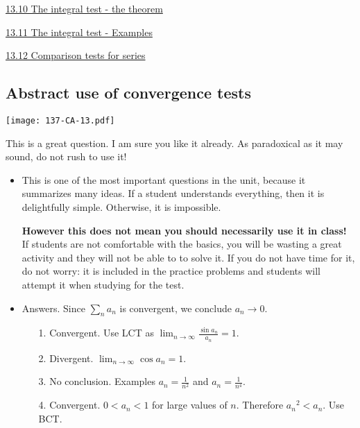 \documentclass[11pt]{article}
\newcommand {\DS} [1] {${\displaystyle #1}$}
\newcommand{\nl}{\hfill \vspace{-1.1\baselineskip}} %
\newcommand{\vx}{\hspace{8mm} \href{https://www.youtube.com/watch?v=spg7c-LY59o&list=PLlwePzQY_wW-FJMnD_ybkXU_jZLVtZttI&index=10}{13.10 The integral test - the theorem} }
\newcommand{\vxi}{\hspace{8mm} \href{https://www.youtube.com/watch?v=bmb_K39nay0&list=PLlwePzQY_wW-FJMnD_ybkXU_jZLVtZttI&index=11}{13.11 The integral test - Examples} }
\newcommand{\vxii}{\hspace{8mm} \href{https://www.youtube.com/watch?v=QbYK4COJUqU&list=PLlwePzQY_wW-FJMnD_ybkXU_jZLVtZttI&index=12}{13.12 Comparison tests for series} }
\begin{document}
\begin{videos}
\vx

\vxi

\vxii
\end{videos}

\newpage
\subsection{Abstract use of convergence tests}

\begin{center}
{ \texttt{[image: 137-CA-13.pdf]}} 
\end{center}

\begin{warning}
This is a great question.  I am sure you like it already.  As paradoxical as it may sound, do not rush to use it!
\end{warning}

\begin{comments}
\nl
	\begin{itemize}
		\item   This is one of the most important questions in the unit, because it summarizes many ideas.  If a student understands everything, then it is delightfully simple.  Otherwise, it is impossible.
		
		{\bf However this does not mean you should necessarily use it in class!}  If students are not comfortable with the basics, you will be wasting a great activity and they will not be able to to solve it.  If you do not have time for it, do not worry: it is included in the practice problems and students will attempt it when studying for the test.
		
		\item Answers.  Since \DS{\sum_{n} a_n} is convergent, we conclude \DS{a_n \longrightarrow 0}.
			\begin{itemize}
				\item[1.]  Convergent.  Use LCT as \DS{\lim_{n \to \infty} \frac{\sin a_n}{a_n} = 1}.
				\item[2.]  Divergent.  \DS{\lim_{n \to \infty} \cos a_n = 1}.
				\item[3.] No conclusion. Examples \DS{a_n = \frac{1}{n^2}} and \DS{a_n = \frac{1}{n^4}}.
				\item[4.]  Convergent.  $0 < a_n <1$ for large values of $n$.  Therefore ${a_n}^2 < a_n$.  Use BCT.
			\end{itemize}
	\end{itemize}
\end{comments}
\end{document}
